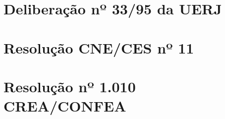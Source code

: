 





























\chapter{Deliberação nº 33/95 da UERJ}
\label{delib3395}
%


\chapter{Resolução CNE/CES nº 11}
\label{cne11}


\chapter{Resolução nº 1.010 CREA/CONFEA}
\label{res1010}







